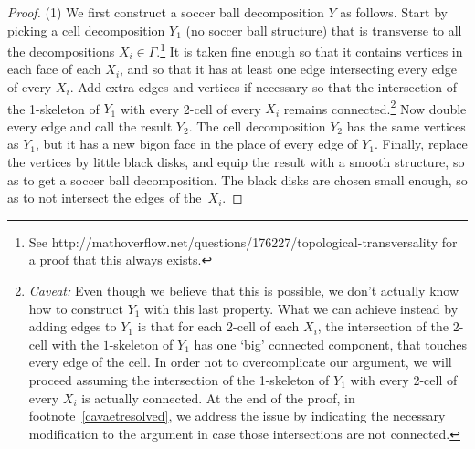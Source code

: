 \documentclass[a4paper,10pt,leqno]{amsart}
\theoremstyle{plain}
\theoremstyle{definition}
\theoremstyle{remark}
\begin{document}
\begin{proof}
(1)
We first construct a soccer ball decomposition $Y$ as follows.
Start by picking a cell decomposition $Y_1$ (no soccer ball structure) 
that is transverse to all the decompositions $X_i \in \Gamma$.\footnote{See http://mathoverflow.net/questions/176227/topological-transversality for a proof that this always exists.}
It is taken fine enough so that it contains vertices in each face of each $X_i$, and so that it has at least one edge intersecting every edge of every $X_i$.
Add extra edges and vertices if necessary so that the intersection of the 1-skeleton of $Y_1$ with every 2-cell of every $X_i$ remains connected.\footnote{{\it Caveat:} Even though we believe that this is possible, we don't actually know how to construct $Y_1$ with this last property. What we can achieve instead by adding edges to $Y_1$ is that for each $2$-cell of each $X_i$, the intersection of the $2$-cell with the $1$-skeleton of $Y_1$ has one `big' connected component, that touches every edge of the cell.  In order not to overcomplicate our argument, we will proceed assuming the intersection of the 1-skeleton of $Y_1$ with every 2-cell of every $X_i$ is actually connected.  At the end of the proof, in footnote~\ref{cavaetresolved}, we address the issue by indicating the necessary modification to the argument in case those intersections are not connected.
}
Now double every edge and call the result $Y_2$. The cell decomposition $Y_2$ has the same vertices as $Y_1$, but it has a new bigon face in the place of every edge of $Y_1$.
Finally, replace the vertices by little black disks, and equip the result with a smooth structure, so as to get a soccer ball decomposition.
The black disks are chosen small enough, so as to not intersect the edges of the~$X_i$.



\end{proof}
\end{document}
